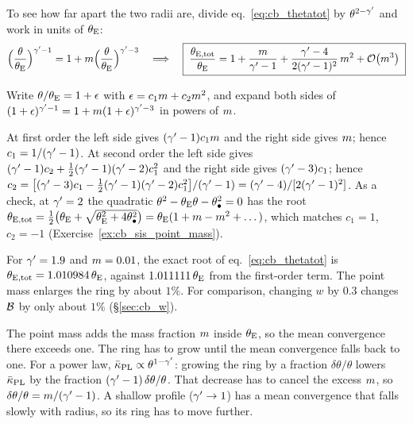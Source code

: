 To see how far apart the two radii are, divide
eq.~\eqref{eq:cb_thetatot} by $\theta^{2-\gamma'}$ and work in units of
$\theta_{\mathrm{E}}$:
\begin{equation}
  \Big(\frac{\theta}{\theta_{\mathrm{E}}}\Big)^{\gamma'-1}
  = 1 + m\Big(\frac{\theta}{\theta_{\mathrm{E}}}\Big)^{\gamma'-3}
  \quad\Longrightarrow\quad
  \boxed{\;
  \frac{\theta_{\mathrm{E,tot}}}{\theta_{\mathrm{E}}}
  = 1 + \frac{m}{\gamma'-1} + \frac{\gamma'-4}{2(\gamma'-1)^2}\,m^2 + \mathcal{O}\!\left(m^3\right)
  \;}
  \label{eq:cb_thetatot_series}
\end{equation}

\begin{derivation}
Write $\theta/\theta_{\mathrm{E}} = 1+\epsilon$ with $\epsilon = c_1m + c_2m^2$,
and expand both sides of
$(1+\epsilon)^{\gamma'-1} = 1 + m(1+\epsilon)^{\gamma'-3}$ in powers of $m$.

At first order the left side gives $(\gamma'-1)c_1m$ and the right side
gives $m$; hence $c_1 = 1/(\gamma'-1)$. At second order the left side
gives $(\gamma'-1)c_2 + \tfrac12(\gamma'-1)(\gamma'-2)c_1^2$ and the right side
gives $(\gamma'-3)c_1$; hence
$c_2 = \big[(\gamma'-3)c_1 - \tfrac12(\gamma'-1)(\gamma'-2)c_1^2\big]/(\gamma'-1)
= (\gamma'-4)/[2(\gamma'-1)^2]$.
As a check, at $\gamma'=2$ the quadratic $\theta^2-\theta_{\mathrm{E}}\theta-\theta_{\bullet}^2=0$
has the root
$\theta_{\mathrm{E,tot}} = \tfrac12\big(\theta_{\mathrm{E}}+\sqrt{\theta_{\mathrm{E}}^2+4\theta_{\bullet}^2}\big)
= \theta_{\mathrm{E}}(1+m-m^2+\dots)$, which matches $c_1=1$, $c_2=-1$
(Exercise~\ref{ex:cb_sis_point_mass}).
\end{derivation}

For $\gamma'=1.9$ and $m=0.01$, the exact root of
eq.~\eqref{eq:cb_thetatot} is $\theta_{\mathrm{E,tot}}=1.010984\,\theta_{\mathrm{E}}$,
against $1.011111\,\theta_{\mathrm{E}}$ from the first-order term. The point mass
enlarges the ring by about $1\%$. For comparison, changing $w$ by $0.3$
changes $\mathcal{B}$ by only about $1\%$
(\S\ref{sec:cb_w}). 

\begin{annotation}
The point mass adds the mass fraction $m$ inside $\theta_{\mathrm{E}}$, so the
mean convergence there exceeds one. The ring has to grow until the mean
convergence falls back to one. For a power law,
$\bar\kappa_{\rm PL}\propto\theta^{1-\gamma'}$: growing the ring by a
fraction $\delta\theta/\theta$ lowers $\bar\kappa_{\rm PL}$ by the
fraction $(\gamma'-1)\,\delta\theta/\theta$. That decrease has to cancel the
excess $m$, so $\delta\theta/\theta = m/(\gamma'-1)$. A shallow profile
($\gamma'\to1$) has a mean convergence that falls slowly with radius, so its
ring has to move further.
\end{annotation}


